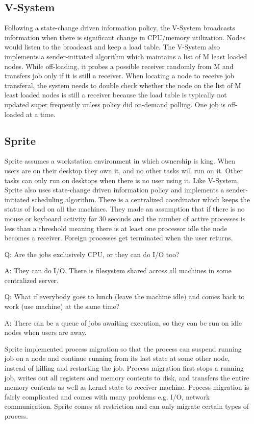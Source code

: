 \documentclass[twoside]{article}
\begin{document}
\subsection{V-System}
Following a state-change driven information policy, the V-System broadcasts information when there is significant change in CPU/memory utilization. Nodes would listen to the broadcast and keep a load table. The V-System also implements a sender-initiated algorithm which maintains a list of M least loaded nodes. While off-loading, it probes a possible receiver randomly from M and transfers job only if it is still a receiver. When locating a node to receive job transferal, the system needs to double check whether the node on the list of M least loaded nodes is still a receiver because the load table is typically not updated super frequently unless policy did on-demand polling. One job is off-loaded at a time. 

\subsection{Sprite}
Sprite assumes a workstation environment in which ownership is king. When users are on their desktop they own it, and no other tasks will run on it. Other tasks can only run on desktops when there is no user using it. Like V-System, Sprite also uses state-change driven information policy and implements a sender-initiated scheduling algorithm. There is a centralized coordinator which keeps the status of load on all the machines. They made an assumption that if there is no mouse or keyboard activity for 30 seconds and the number of active processes is less than a threshold meaning there is at least one processor idle the node becomes a receiver. Foreign processes get terminated when the user returns. 

Q: Are the jobs exclusively CPU, or they can do I/O too?

A: They can do I/O. There is filesystem shared across all machines in some centralized server. 

Q: What if everybody goes to lunch (leave the machine idle) and comes back to work (use machine) at the same time?

A: There can be a queue of jobs awaiting execution, so they can be run on idle nodes when users are away. 

Sprite implemented process migration so that the process can suspend running job on a node and continue running from its last state at some other node, instead of killing and restarting the job. Process migration first stops a running job, writes out all registers and memory contents to disk, and transfers the entire memory contents as well as kernel state to receiver machine. Process migration is fairly complicated and comes with many problems e.g. I/O, network communication. Sprite comes at restriction and can only migrate certain types of process.
\end{document}
